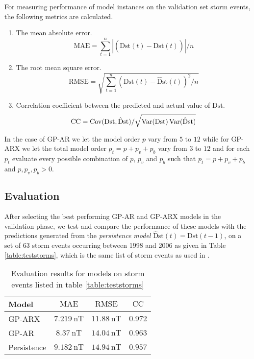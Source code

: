 For measuring performance of model instances on the validation set storm events, the following metrics are calculated.

\begin{enumerate}
    \item The mean absolute error.
    \begin{equation}
        \mathrm{MAE} = \sum_{t=1}^{n} \left |(\mathrm{Dst}(t) - \mathrm{\hat{D}st}(t)) \right | / n
    \end{equation}
    \item The root mean square error.
    \begin{equation}
        \mathrm{RMSE} = \sqrt{\sum_{t=1}^{n} (\mathrm{Dst}(t) - \mathrm{\hat{D}st}(t))^2 / n}
    \end{equation}
    \item Correlation coefficient between the predicted and actual value of $ \mathrm{Dst}$.
    \begin{equation}
        \mathrm{CC} = \operatorname*{Cov}(\mathrm{Dst}, \mathrm{\hat{D}st})/\sqrt{\operatorname*{Var}(\mathrm{Dst}) \operatorname*{Var}(\mathrm{\hat{D}st})}
    \end{equation}
\end{enumerate}
%
In the case of GP-AR we let the model order $p$ vary from $5$ to $12$ while for GP-ARX we let the total model order $p_t = p + p_v + p_b$ vary from $3$ to $12$ and for each $p_t$ evaluate every possible combination of $p$, $p_v$ and $p_b$ such that $p_t = p + p_v + p_b$ and $p, p_{v}, p_b > 0$.


\subsection*{Evaluation}\label{sec:gpOSAEval}

After selecting the best performing GP-AR and GP-ARX models in the validation phase, we test and compare the performance of these models with the predictions generated from the \emph{persistence model} 
$\mathrm{\hat{D}st}(t) = \mathrm{Dst}(t-1)$, on a set of 63 storm events occurring between 1998 and 2006 as given in Table \ref{table:teststorms}, which is the same list of storm events as used in 
\citet{Ji2012}.

\begin{table}[ht]
    \centering
    \caption{Evaluation results for models on storm events listed in table \ref{table:teststorms}}
    \label{table:results}
    \begin{tabular}{l c c c}
    \hline
    \textbf{Model} & $\mathrm{MAE}$ & $\mathrm{RMSE}$ & $\mathrm{CC}$\\ \hline
    GP-ARX & $\SI{7.219}{\nano\tesla}$ & $\SI{11.88}{\nano\tesla}$ & $0.972$\\
    GP-AR & $\SI{8.37}{\nano\tesla}$ & $\SI{14.04}{\nano\tesla}$ & $0.963$\\
    Persistence & $\SI{9.182}{\nano\tesla}$ & $\SI{14.94}{\nano\tesla}$ & $0.957$\\
    \hline
    \end{tabular}
\end{table}

